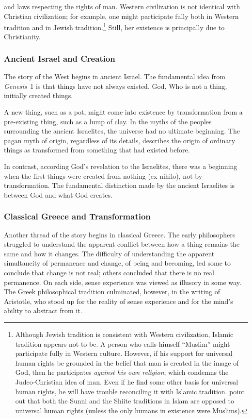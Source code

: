 \documentclass[twocolumn]{article}
\begin{document}
and laws respecting the rights of man.  Western civilization is not identical
with Christian civilization; for example, one might participate fully both in
Western tradition and in Jewish tradition.\footnote{%
   Although Jewish tradition is consistent with Western civilization, Islamic
   tradition appears not to be.  A person who calls himself ``Muslim'' might
   participate fully in Western culture.  However, if his support for universal
   human rights be grounded in the belief that man is created in the image of
   God, then he participates \emph{against his own religion}, which condemns
   the Judeo-Christian idea of man.  Even if he find some other basis for
   universal human rights, he will have trouble reconciling it with Islamic
   tradition.  \cite{as2003} point out that both the Sunni and the Shiite
   traditions in Islam are opposed to universal human rights (unless the only
   humans in existence were Muslims).
}
Still, her existence is principally due to Christianity.

\subsubsection{Ancient Israel and Creation}

The story of the West begins in ancient Israel.  The fundamental idea from {\it
Genesis}~1 is that things have not always existed.  God, Who is not a thing,
initially created things.

A new thing, such as a pot, might come into existence by transformation from a
pre-existing thing, such as a lump of clay.  In the myths of the peoples
surrounding the ancient Israelites, the universe had no ultimate beginning.
The pagan myth of origin, regardless of its details, describes the origin of
ordinary things as transformed from something that had existed before.

In contrast, according God's revelation to the Israelites, there was a
beginning when the first things were created from nothing (ex nihilo), not by
transformation.  The fundamental distinction made by the ancient Israelites is
between God and what God creates.

\subsubsection{Classical Greece and Transformation}

Another thread of the story begins in classical Greece.  The early philosophers
struggled to understand the apparent conflict between how a thing remains the
same and how it changes.  The difficulty of understanding the apparent
simultaneity of permanence and change, of being and becoming, led some to
conclude that change is not real; others concluded that there is no real
permanence.  On each side, sense experience was viewed as illusory in some way.
The Greek philosophical tradition culminated, however, in the writing of
Aristotle, who stood up for the reality of sense experience and for the mind's
ability to abstract from it.
\end{document}
